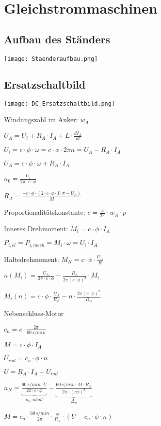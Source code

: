 \documentclass[german]{latex4ei/latex4ei_sheet}
\begin{document}
	\section{Gleichstrommaschinen}
		\begin{sectionbox}
			\subsection{Aufbau des Ständers}
				\texttt{[image: Staenderaufbau.png]}
			\subsection{Ersatzschaltbild}
				\texttt{[image: DC\_Ersatzschaltbild.png]}
				\begin{symbolbox}
					\item Windungszahl im Anker: $w_A$
					\item $U_A = U_i +R_A\cdot I_A+L\cdot \frac{dI_A}{dt}$
					\item $U_i = c\cdot \phi \cdot \omega = c \cdot \phi \cdot 2\pi n = U_A - R_A\cdot I_A$
					\item $U_A = c\cdot \phi \cdot \omega +R_A\cdot I_A$
					\item $n_0 = \frac{U_i}{2\pi\cdot c\cdot \phi}$
					\item $R_A = \frac{-c\cdot \phi\cdot (2\cdot c\cdot \phi \cdot I\cdot \pi - U_A)}{M}$
					\item Proportionalitätskonstante: $c =\frac{4}{2\pi}\cdot w_A\cdot p$
					\item Inneres Drehmoment: $M_i = c\cdot \phi \cdot I_A$
					\item $ P_{i, el} = P_{i, mech} = M_i \cdot \omega = U_i\cdot I_A$
					\item Haltedrehmoment: $M_H = c\cdot \phi \cdot \frac{U_A}{R}$
					\item $n(M_i) = \frac{U_A}{2\pi\cdot c\cdot \phi}-\frac{R_A}{2\pi(c\cdot \phi)^2}\cdot M_i$
					\item $M_i(n) = c\cdot \phi\cdot \frac{U_A}{R_A}-n\cdot \frac{2\pi(c\cdot \phi)^2}{R_A}$
				\end{symbolbox}

				\begin{bluebox}{Nebenschluss-Motor}
					\item $c_n = c\cdot \frac{2\pi}{60\,s/min}$
					\item $M = c\cdot \phi \cdot I_A$
					\item $U_{ind} = c_n \cdot \phi \cdot n$
					\item $U = R_A\cdot I_A + U_{ind}$
					\item $n_N = \underbrace{\frac{60\,s/min\cdot U}{2\pi\cdot c\cdot \phi}}_{n_0, ideal}-\underbrace{\frac{60\,s/min\cdot M\cdot R_A}{2\pi\cdot(c\phi)^2}}_{\Delta_n}$
					\item $M = c_n\cdot \frac{60\,s/min}{2\pi}\cdot \frac{\phi}{R_A}\cdot (U-c_n\cdot \phi \cdot n)$
				\end{bluebox}


\end{sectionbox}
\end{document}
